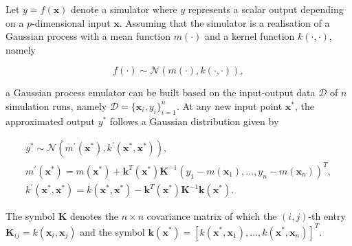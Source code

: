 \documentclass[utf8]{FrontiersinHarvard}
\begin{document}
Let $y=f(\mathbf{x})$ denote a simulator where $y$ represents a scalar output depending on a $p$-dimensional input $\mathbf{x}$. Assuming that the simulator is a realisation of a Gaussian process with a mean function $m(\cdot)$ and a kernel function $k(\cdot,\cdot)$, namely
\begin{linenomath}
\begin{equation}
f(\cdot) \sim \mathcal{N}(m(\cdot), k(\cdot,\cdot)), \label{eq:GPprior}
\end{equation}
\end{linenomath}
a Gaussian process emulator can be built based on the input-output data $\mathcal{D}$ of $n$ simulation runs, namely $\mathcal{D}=\{\mathbf{x}_i, y_i\}_{i=1}^{n}$. At any new input point $\mathbf{x}^\ast$, the approximated output $y^\ast$ follows a Gaussian distribution given by
\begin{linenomath}
\begin{gather}
y^\ast  \sim  \mathcal{N}
\left(m^{\prime}(\mathbf{x}^\ast), k^{\prime}(\mathbf{x}^\ast,\mathbf{x}^\ast) \right),\label{eq:conditionalGaussian}\\
m^{\prime}(\mathbf{x}^\ast)=m(\mathbf{x}^\ast) +\mathbf{k}^T(\mathbf{x}^\ast) \mathbf{K}^{-1} \left(y_1-m(\mathbf{x}_1), \ldots, y_n-m(\mathbf{x}_n) \right)^T, \label{eq:conditionalGaussianM}\\
k^{\prime}(\mathbf{x}^\ast,\mathbf{x}^\ast) = k(\mathbf{x}^\ast,\mathbf{x}^\ast)-\mathbf{k}^T(\mathbf{x}^\ast) \mathbf{K}^{-1} \mathbf{k}(\mathbf{x}^\ast). \label{eq:conditionalGaussianC}
\end{gather}
\end{linenomath}
The symbol $\mathbf{K}$ denotes the $n \times n$ covariance matrix of which the $(i,j)$-th entry $\mathbf{K}_{ij}=k(\mathbf{x}_i,\mathbf{x}_j)$ and the symbol $\mathbf{k}(\mathbf{x}^\ast)=\left[k(\mathbf{x}^\ast,\mathbf{x}_1), \ldots, k(\mathbf{x}^\ast,\mathbf{x}_n) \right]^T$.
\end{document}
